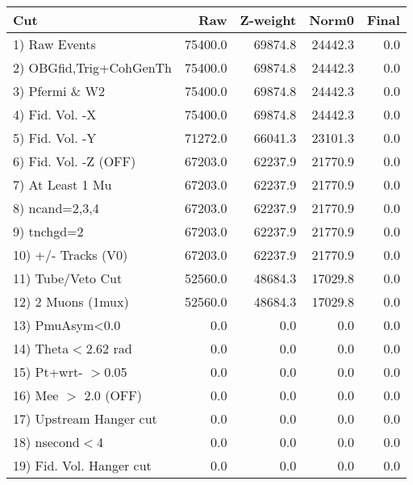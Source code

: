  \begin{table}[h!]\centering
 \begin{tabular}{||l||r|r|r|r||}
 \hline
 \hline
 Cut & Raw & Z-weight & Norm0 & Final \\
 \hline
  1) Raw Events           &     75400.0 &     69874.8 &     24442.3 &         0.0 \\
  2) OBGfid,Trig+CohGenTh &     75400.0 &     69874.8 &     24442.3 &         0.0 \\
  3) Pfermi \& W2         &     75400.0 &     69874.8 &     24442.3 &         0.0 \\
  4) Fid. Vol. -X         &     75400.0 &     69874.8 &     24442.3 &         0.0 \\
  5) Fid. Vol. -Y         &     71272.0 &     66041.3 &     23101.3 &         0.0 \\
  6) Fid. Vol. -Z (OFF)   &     67203.0 &     62237.9 &     21770.9 &         0.0 \\
  7) At Least 1 Mu        &     67203.0 &     62237.9 &     21770.9 &         0.0 \\
  8) ncand=2,3,4          &     67203.0 &     62237.9 &     21770.9 &         0.0 \\
  9) tnchgd=2             &     67203.0 &     62237.9 &     21770.9 &         0.0 \\
 10) +/- Tracks (V0)      &     67203.0 &     62237.9 &     21770.9 &         0.0 \\
 11) Tube/Veto Cut        &     52560.0 &     48684.3 &     17029.8 &         0.0 \\
 12) 2 Muons (1mux)       &     52560.0 &     48684.3 &     17029.8 &         0.0 \\
 13) PmuAsym<0.0          &         0.0 &         0.0 &         0.0 &         0.0 \\
 14) Theta$<$2.62 rad     &         0.0 &         0.0 &         0.0 &         0.0 \\
 15) Pt+wrt- $>$0.05      &         0.0 &         0.0 &         0.0 &         0.0 \\
 16) Mee $>$ 2.0  (OFF)   &         0.0 &         0.0 &         0.0 &         0.0 \\
 17) Upstream Hanger cut  &         0.0 &         0.0 &         0.0 &         0.0 \\
 18) nsecond$<$4          &         0.0 &         0.0 &         0.0 &         0.0 \\
 19) Fid. Vol. Hanger cut &         0.0 &         0.0 &         0.0 &         0.0 \\

\end{tabular}
\end{table}
